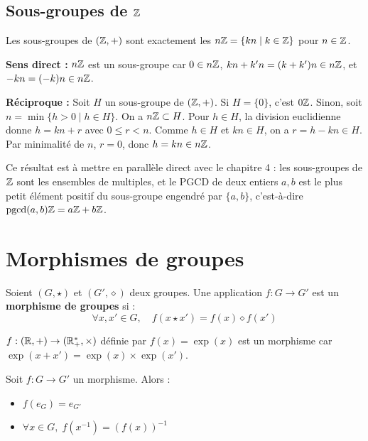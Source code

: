 \subsection{Sous-groupes de $\mathbb{Z}$}

\begin{propbox}
Les sous-groupes de $(\mathbb{Z}, +)$ sont exactement les $n\mathbb{Z} = \{kn \mid k \in \mathbb{Z}\}$ pour $n \in \mathbb{Z}$.
\end{propbox}

\begin{proofbox}
\textbf{Sens direct :} $n\mathbb{Z}$ est un sous-groupe car $0 \in n\mathbb{Z}$, $kn + k'n = (k+k')n \in n\mathbb{Z}$, et $-kn = (-k)n \in n\mathbb{Z}$.

\textbf{Réciproque :} Soit $H$ un sous-groupe de $(\mathbb{Z}, +)$. Si $H = \{0\}$, c'est $0\mathbb{Z}$. Sinon, soit $n = \min\{h > 0 \mid h \in H\}$. On a $n\mathbb{Z} \subset H$. Pour $h \in H$, la division euclidienne donne $h = kn + r$ avec $0 \leqslant r < n$. Comme $h \in H$ et $kn \in H$, on a $r = h - kn \in H$. Par minimalité de $n$, $r = 0$, donc $h = kn \in n\mathbb{Z}$.
\end{proofbox}

\begin{intuitionbox}
Ce résultat est à mettre en parallèle direct avec le chapitre 4 : les sous-groupes de $\mathbb{Z}$ sont les ensembles de multiples, et le PGCD de deux entiers $a, b$ est le plus petit élément positif du sous-groupe engendré par $\{a, b\}$, c'est-à-dire $\mathrm{pgcd}(a,b)\mathbb{Z} = a\mathbb{Z} + b\mathbb{Z}$.
\end{intuitionbox}


\section{Morphismes de groupes}

\begin{defbox}
Soient $(G, \star)$ et $(G', \diamond)$ deux groupes. Une application $f : G \to G'$ est un \textbf{morphisme de groupes} si :
\[\forall x, x' \in G, \quad f(x \star x') = f(x) \diamond f(x')\]
\end{defbox}

\begin{exbox}[L'exponentielle]
$f : (\mathbb{R}, +) \to (\mathbb{R}^*_+, \times)$ définie par $f(x) = \exp(x)$ est un morphisme car $\exp(x + x') = \exp(x) \times \exp(x')$.
\end{exbox}

\begin{propbox}
Soit $f : G \to G'$ un morphisme. Alors :
\begin{itemize}[leftmargin=1cm]
  \item $f(e_G) = e_{G'}$
  \item $\forall x \in G, \; f(x^{-1}) = (f(x))^{-1}$
\end{itemize}
\end{propbox}

